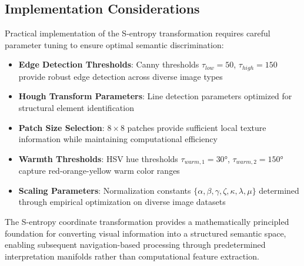 \documentclass[11pt,a4paper]{article}
\begin{document}
\subsection{Implementation Considerations}

Practical implementation of the S-entropy transformation requires careful parameter tuning to ensure optimal semantic discrimination:

\begin{itemize}
\item \textbf{Edge Detection Thresholds}: Canny thresholds $\tau_{low} = 50$, $\tau_{high} = 150$ provide robust edge detection across diverse image types
\item \textbf{Hough Transform Parameters}: Line detection parameters optimized for structural element identification
\item \textbf{Patch Size Selection}: $8 \times 8$ patches provide sufficient local texture information while maintaining computational efficiency  
\item \textbf{Warmth Thresholds}: HSV hue thresholds $\tau_{warm,1} = 30°$, $\tau_{warm,2} = 150°$ capture red-orange-yellow warm color ranges
\item \textbf{Scaling Parameters}: Normalization constants $\{\alpha, \beta, \gamma, \zeta, \kappa, \lambda, \mu\}$ determined through empirical optimization on diverse image datasets
\end{itemize}

The S-entropy coordinate transformation provides a mathematically principled foundation for converting visual information into a structured semantic space, enabling subsequent navigation-based processing through predetermined interpretation manifolds rather than computational feature extraction.
\end{document}
